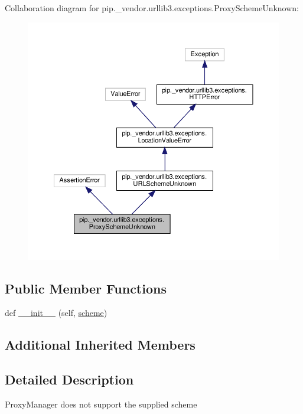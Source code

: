 Collaboration diagram for pip.\+\_\+vendor.\+urllib3.\+exceptions.\+Proxy\+Scheme\+Unknown\+:
\nopagebreak
\begin{figure}[H]
\begin{center}
\leavevmode
\includegraphics[width=350pt]{classpip_1_1__vendor_1_1urllib3_1_1exceptions_1_1ProxySchemeUnknown__coll__graph}
\end{center}
\end{figure}
\subsection*{Public Member Functions}
\begin{DoxyCompactItemize}
\item 
def \hyperlink{classpip_1_1__vendor_1_1urllib3_1_1exceptions_1_1ProxySchemeUnknown_afa67aa954179522b8055da71bd49c51e}{\+\_\+\+\_\+init\+\_\+\+\_\+} (self, \hyperlink{classpip_1_1__vendor_1_1urllib3_1_1exceptions_1_1URLSchemeUnknown_ab0b3aaa83326fca7d4fac9550bc79750}{scheme})
\end{DoxyCompactItemize}
\subsection*{Additional Inherited Members}


\subsection{Detailed Description}
\begin{DoxyVerb}ProxyManager does not support the supplied scheme\end{DoxyVerb}
 

